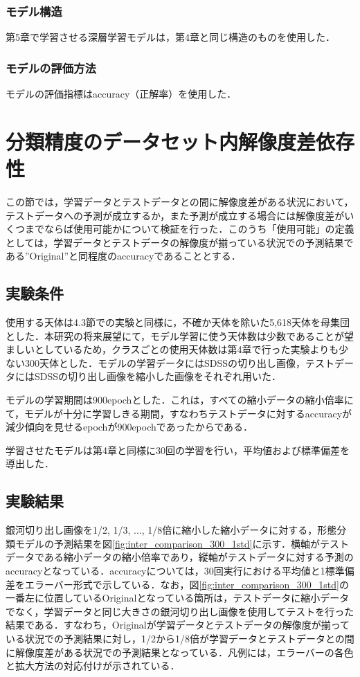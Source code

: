 \documentclass[a4j, 11pt]{jreport}
\begin{document}
\subsubsection{モデル構造}
第5章で学習させる深層学習モデルは，第4章と同じ構造のものを使用した．
 
\subsubsection{モデルの評価方法}
モデルの評価指標はaccuracy（正解率）を使用した．


\section{分類精度のデータセット内解像度差依存性}
この節では，学習データとテストデータとの間に解像度差がある状況において，テストデータへの予測が成立するか，また予測が成立する場合には解像度差がいくつまでならば使用可能かについて検証を行った．このうち「使用可能」の定義としては，学習データとテストデータの解像度が揃っている状況での予測結果である''Original''と同程度のaccuracyであることとする．

\subsection{実験条件}
使用する天体は4.3節での実験と同様に，不確か天体を除いた5,618天体を母集団とした．本研究の将来展望にて，モデル学習に使う天体数は少数であることが望ましいとしているため，クラスごとの使用天体数は第4章で行った実験よりも少ない300天体とした．モデルの学習データにはSDSSの切り出し画像，テストデータにはSDSSの切り出し画像を縮小した画像をそれぞれ用いた．

モデルの学習期間は900epochとした．これは，すべての縮小データの縮小倍率にて，モデルが十分に学習しきる期間，すなわちテストデータに対するaccuracyが減少傾向を見せるepochが900epochであったからである．

学習させたモデルは第4章と同様に30回の学習を行い，平均値および標準偏差を導出した．


\subsection{実験結果}
銀河切り出し画像を1/2, 1/3, ..., 1/8倍に縮小した縮小データに対する，形態分類モデルの予測結果を図\ref{fig:inter_comparison_300_1std}に示す．横軸がテストデータである縮小データの縮小倍率であり，縦軸がテストデータに対する予測のaccuracyとなっている．accuracyについては，30回実行における平均値と1標準偏差をエラーバー形式で示している．なお，図\ref{fig:inter_comparison_300_1std}の一番左に位置しているOriginalとなっている箇所は，テストデータに縮小データでなく，学習データと同じ大きさの銀河切り出し画像を使用してテストを行った結果である．すなわち，Originalが学習データとテストデータの解像度が揃っている状況での予測結果に対し，1/2から1/8倍が学習データとテストデータとの間に解像度差がある状況での予測結果となっている．凡例には，エラーバーの各色と拡大方法の対応付けが示されている．
\end{document}
